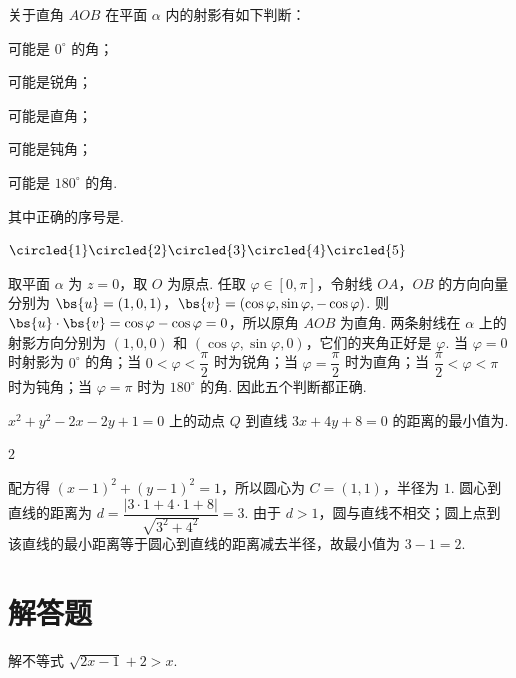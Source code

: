 \begin{problem}
关于直角 \(AOB\) 在平面 \(\alpha\) 内的射影有如下判断：

\begin{circlelist}
\item 可能是 \(0^\circ\) 的角；
\item 可能是锐角；
\item 可能是直角；
\item 可能是钝角；
\item 可能是 \(180^\circ\) 的角.
\end{circlelist}

其中正确的序号是\fillinblank{}.
\end{problem}

\begin{answer}
\(\circled{1}\circled{2}\circled{3}\circled{4}\circled{5}\)
\end{answer}

\begin{solution}
取平面 \(\alpha\) 为 \(z=0\)，取 \(O\) 为原点. 任取 \(\varphi\in[0,\pi]\)，令射线 \(OA\)，\(OB\) 的方向向量分别为 \(\bs{u}=(1,0,1)\)，\(\bs{v}=(\cos\varphi,\sin\varphi,-\cos\varphi)\). 则 \(\bs{u}\cdot\bs{v}=\cos\varphi-\cos\varphi=0\)，所以原角 \(AOB\) 为直角. 两条射线在 \(\alpha\) 上的射影方向分别为 \((1,0,0)\) 和 \((\cos\varphi,\sin\varphi,0)\)，它们的夹角正好是 \(\varphi\). 当 \(\varphi=0\) 时射影为 \(0^\circ\) 的角；当 \(0<\varphi<\dfrac{\pi}{2}\) 时为锐角；当 \(\varphi=\dfrac{\pi}{2}\) 时为直角；当 \(\dfrac{\pi}{2}<\varphi<\pi\) 时为钝角；当 \(\varphi=\pi\) 时为 \(180^\circ\) 的角. 因此五个判断都正确.
\end{solution}

\begin{problem}
\(x^{2}+y^{2}-2x-2y+1=0\) 上的动点 \(Q\) 到直线 \(3x+4y+8=0\) 的距离的最小值为\fillinblank{}.
\end{problem}

\begin{answer}
\(2\)
\end{answer}

\begin{solution}
配方得 \((x-1)^2+(y-1)^2=1\)，所以圆心为 \(C=(1,1)\)，半径为 \(1\). 圆心到直线的距离为 \(d=\dfrac{|3\cdot1+4\cdot1+8|}{\sqrt{3^2+4^2}}=3\). 由于 \(d>1\)，圆与直线不相交；圆上点到该直线的最小距离等于圆心到直线的距离减去半径，故最小值为 \(3-1=2\).
\end{solution}

\section{解答题}
\begin{problem}
解不等式 \(\sqrt{2x-1}+2>x\).
\end{problem}

